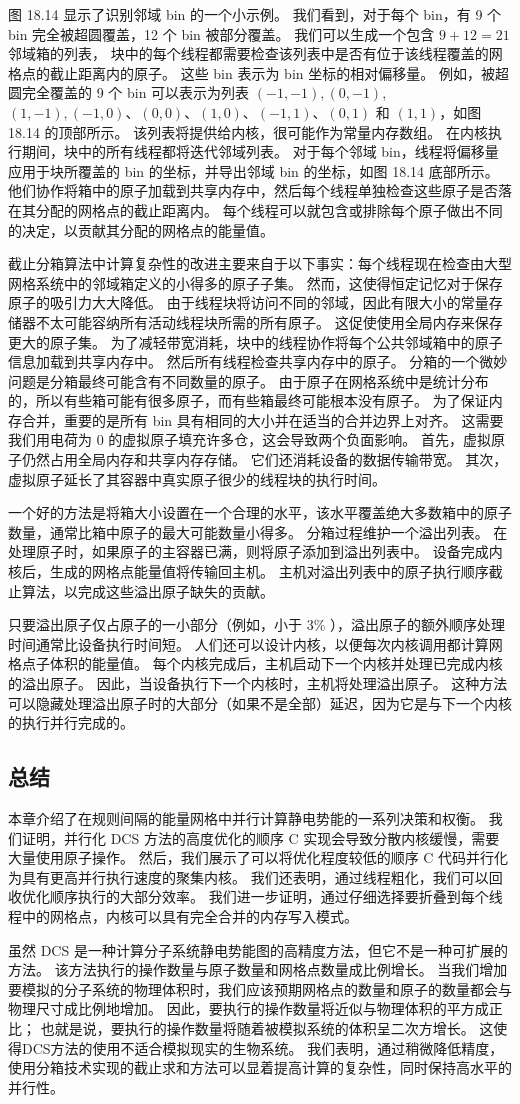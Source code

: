 图 18.14 显示了识别邻域 bin 的一个小示例。 我们看到，对于每个 bin，有 9 个 bin 完全被超圆覆盖，12 个 bin 被部分覆盖。 
我们可以生成一个包含 $9+12=21$ 邻域箱的列表，
块中的每个线程都需要检查该列表中是否有位于该线程覆盖的网格点的截止距离内的原子。 
这些 bin 表示为 bin 坐标的相对偏移量。 
例如，被超圆完全覆盖的 9 个 bin 可以表示为列表 $(-1,-1),(0,-1)$, $(1,-1),(-1,0) 、(0,0)、(1,0)、(-1,1)、(0,1)$ 和 $(1,1)$，如图 18.14 的顶部所示。 
该列表将提供给内核，很可能作为常量内存数组。 
在内核执行期间，块中的所有线程都将迭代邻域列表。 
对于每个邻域 bin，线程将偏移量应用于块所覆盖的 bin 的坐标，并导出邻域 bin 的坐标，如图 18.14 底部所示。 
他们协作将箱中的原子加载到共享内存中，然后每个线程单独检查这些原子是否落在其分配的网格点的截止距离内。 
每个线程可以就包含或排除每个原子做出不同的决定，以贡献其分配的网格点的能量值。

截止分箱算法中计算复杂性的改进主要来自于以下事实：每个线程现在检查由大型网格系统中的邻域箱定义的小得多的原子子集。 
然而，这使得恒定记忆对于保存原子的吸引力大大降低。 
由于线程块将访问不同的邻域，因此有限大小的常量存储器不太可能容纳所有活动线程块所需的所有原子。 
这促使使用全局内存来保存更大的原子集。 为了减轻带宽消耗，块中的线程协作将每个公共邻域箱中的原子信息加载到共享内存中。 
然后所有线程检查共享内存中的原子。 分箱的一个微妙问题是分箱最终可能含有不同数量的原子。 
由于原子在网格系统中是统计分布的，所以有些箱可能有很多原子，而有些箱最终可能根本没有原子。 
为了保证内存合并，重要的是所有 bin 具有相同的大小并在适当的合并边界上对齐。 
这需要我们用电荷为 0 的虚拟原子填充许多仓，这会导致两个负面影响。 
首先，虚拟原子仍然占用全局内存和共享内存存储。 它们还消耗设备的数据传输带宽。 
其次，虚拟原子延长了其容器中真实原子很少的线程块的执行时间。

一个好的方法是将箱大小设置在一个合理的水平，该水平覆盖绝大多数箱中的原子数量，通常比箱中原子的最大可能数量小得多。 
分箱过程维护一个溢出列表。 在处理原子时，如果原子的主容器已满，则将原子添加到溢出列表中。 
设备完成内核后，生成的网格点能量值将传输回主机。 主机对溢出列表中的原子执行顺序截止算法，以完成这些溢出原子缺失的贡献。

只要溢出原子仅占原子的一小部分（例如，小于 $3 \%$ ），溢出原子的额外顺序处理时间通常比设备执行时间短。 
人们还可以设计内核，以便每次内核调用都计算网格点子体积的能量值。 
每个内核完成后，主机启动下一个内核并处理已完成内核的溢出原子。 
因此，当设备执行下一个内核时，主机将处理溢出原子。 
这种方法可以隐藏处理溢出原子时的大部分（如果不是全部）延迟，因为它是与下一个内核的执行并行完成的。

\subsection{总结}
本章介绍了在规则间隔的能量网格中并行计算静电势能的一系列决策和权衡。 
我们证明，并行化 DCS 方法的高度优化的顺序 C 实现会导致分散内核缓慢，需要大量使用原子操作。 
然后，我们展示了可以将优化程度较低的顺序 C 代码并行化为具有更高并行执行速度的聚集内核。 
我们还表明，通过线程粗化，我们可以回收优化顺序执行的大部分效率。 
我们进一步证明，通过仔细选择要折叠到每个线程中的网格点，内核可以具有完全合并的内存写入模式。

虽然 DCS 是一种计算分子系统静电势能图的高精度方法，但它不是一种可扩展的方法。 
该方法执行的操作数量与原子数量和网格点数量成比例增长。 
当我们增加要模拟的分子系统的物理体积时，我们应该预期网格点的数量和原子的数量都会与物理尺寸成比例地增加。 
因此，要执行的操作数量将近似与物理体积的平方成正比； 也就是说，要执行的操作数量将随着被模拟系统的体积呈二次方增长。 
这使得DCS方法的使用不适合模拟现实的生物系统。 
我们表明，通过稍微降低精度，使用分箱技术实现的截止求和方法可以显着提高计算的复杂性，同时保持高水平的并行性。